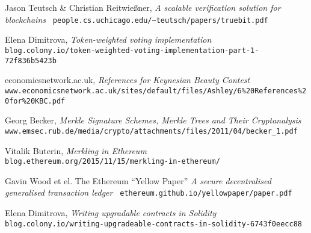 \begin{thebibliography}{9}
  
  
  Jason Teutsch \& Christian Reitwießner,
  \emph{A scalable verification solution for blockchains}
  \verb| people.cs.uchicago.edu/~teutsch/papers/truebit.pdf |
  
  Elena Dimitrova,
  \emph{Token-weighted voting implementation}
  \verb| blog.colony.io/token-weighted-voting-implementation-part-1-72f836b5423b |
  
  economicsnetwork.ac.uk,
  \emph{References for Keynesian Beauty Contest}
  \verb| www.economicsnetwork.ac.uk/sites/default/files/Ashley/6%20References%20for%20KBC.pdf |

  Georg Becker,
  \emph{Merkle Signature Schemes, Merkle Trees and Their Cryptanalysis}
  \verb| www.emsec.rub.de/media/crypto/attachments/files/2011/04/becker_1.pdf |

  Vitalik Buterin,
  \emph{Merkling in Ethereum}
  \verb| blog.ethereum.org/2015/11/15/merkling-in-ethereum/ |
  
  Gavin Wood et el.
  The Ethereum ``Yellow Paper''
  \emph{A secure decentralised generalised transaction ledger}
  \verb| ethereum.github.io/yellowpaper/paper.pdf |
  
  Elena Dimitrova,
  \emph{Writing upgradable contracts in Solidity}
  \verb| blog.colony.io/writing-upgradeable-contracts-in-solidity-6743f0eecc88 |
  

\end{thebibliography}